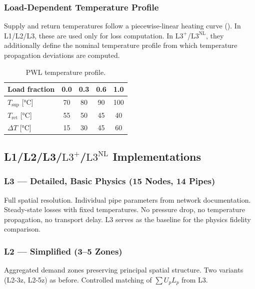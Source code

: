 \documentclass[review,3p]{elsarticle}
\newcommand{\Lplus}{\mathrm{L3}^{+}}
\newcommand{\Lnl}{\mathrm{L3}^{\mathrm{NL}}}
\begin{document}
\subsubsection{Load-Dependent Temperature Profile}
\label{sec:case_temp_profile}

Supply and return temperatures follow a piecewise-linear heating
curve (). In L1/L2/L3, these are used only for loss
computation. In $\Lplus$/$\Lnl$, they additionally define the
nominal temperature profile from which temperature propagation
deviations are computed.

\begin{table}[htbp]
\centering
\caption{PWL temperature profile.}
\label{tab:pwl}
\begin{tabular}{@{}lcccc@{}}
\toprule
Load fraction & 0.0 & 0.3 & 0.6 & 1.0 \\
\midrule
$T_{\mathrm{sup}}$ [\si{\celsius}] & 70 & 80 & 90 & 100 \\
$T_{\mathrm{ret}}$ [\si{\celsius}] & 55 & 50 & 45 & 40 \\
$\Delta T$ [\si{\celsius}] & 15 & 30 & 45 & 60 \\
\bottomrule
\end{tabular}
\end{table}

\subsection{L1/L2/L3/$\Lplus$/$\Lnl$ Implementations}
\label{sec:case_levels}

\subsubsection{L3 --- Detailed, Basic Physics (15 Nodes, 14 Pipes)}

Full spatial resolution. Individual pipe parameters from network
documentation. Steady-state losses with fixed temperatures. No
pressure drop, no temperature propagation, no transport delay. L3
serves as the baseline for the physics fidelity comparison.

\subsubsection{L2 --- Simplified (3--5 Zones)}

Aggregated demand zones preserving principal spatial structure.
Two variants (L2-3z, L2-5z) as before. Controlled matching of
$\sum U_p L_p$ from L3.
\end{document}
